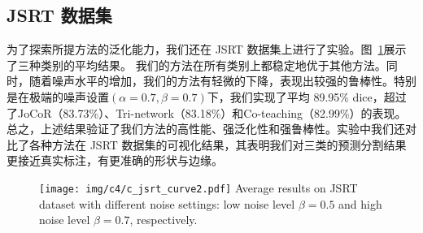 \subsection{JSRT 数据集}

为了探索所提方法的泛化能力，我们还在 JSRT 数据集上进行了实验。图~\ref{fig:jsrt_curve}展示了三种类别的平均结果。%
我们的方法在所有类别上都稳定地优于其他方法。同时，随着噪声水平的增加，我们的方法有轻微的下降，表现出较强的鲁棒性。特别是在极端的噪声设置$(\alpha=0.7, \beta=0.7)$下，我们实现了平均 89.95\% dice，超过了JoCoR（83.73\%）、Tri-network（83.18\%）和Co-teaching（82.99\%）的表现。
总之，上述结果验证了我们方法的高性能、强泛化性和强鲁棒性。实验中我们还对比了各种方法在 JSRT 数据集的可视化结果，其表明我们对三类的预测分割结果更接近真实标注，有更准确的形状与边缘。

    \begin{figure}[tbh]
        \centering 
        \texttt{[image: img/c4/c\_jsrt\_curve2.pdf]}
        {Average results on JSRT dataset with different noise settings: low noise level $\beta=0.5$ and high noise level $\beta=0.7$, respectively. } %
        \label{fig:jsrt_curve}
    \end{figure}


